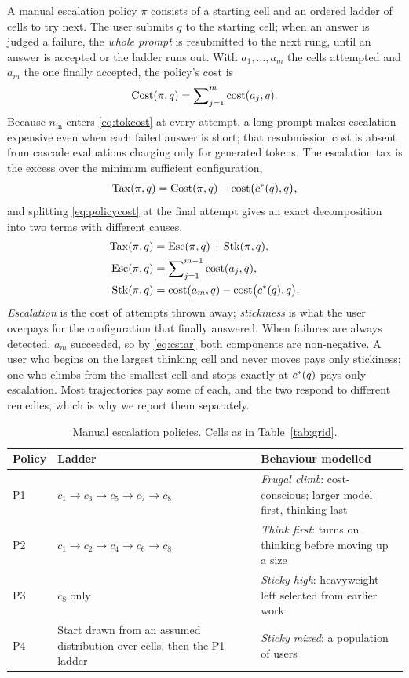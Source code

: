 A manual escalation policy $\pi$ consists of a starting cell and an ordered
ladder of cells to try next. The user submits $q$ to the starting cell; when
an answer is judged a failure, the \emph{whole prompt} is resubmitted to the
next rung, until an answer is accepted or the ladder runs out. With
$a_1, \dots, a_m$ the cells attempted and $a_m$ the one finally accepted, the
policy's cost is
\begin{equation}
  \mathrm{Cost}(\pi, q) = \sum\nolimits_{j=1}^{m} \mathrm{cost}(a_j, q).
  \label{eq:policycost}
\end{equation}
Because $n_{\mathrm{in}}$ enters \eqref{eq:tokcost} at every attempt, a long
prompt makes escalation expensive even when each failed answer is short; that
resubmission cost is absent from cascade evaluations charging only for
generated tokens. The escalation tax is the excess over the minimum
sufficient configuration,
\begin{equation}
  \mathrm{Tax}(\pi, q) = \mathrm{Cost}(\pi, q) - \mathrm{cost}\bigl(c^{*}(q), q\bigr),
  \label{eq:tax}
\end{equation}
and splitting \eqref{eq:policycost} at the final attempt gives an exact
decomposition into two terms with different causes,
\begin{align}
  \mathrm{Tax}(\pi, q) &= \mathrm{Esc}(\pi, q) + \mathrm{Stk}(\pi, q), \label{eq:decomp}\\
  \mathrm{Esc}(\pi, q) &= \sum\nolimits_{j=1}^{m-1} \mathrm{cost}(a_j, q), \nonumber\\
  \mathrm{Stk}(\pi, q) &= \mathrm{cost}(a_m, q) - \mathrm{cost}\bigl(c^{*}(q), q\bigr). \nonumber
\end{align}
\emph{Escalation} is the cost of attempts thrown away; \emph{stickiness} is
what the user overpays for the configuration that finally answered. When
failures are always detected, $a_m$ succeeded, so by \eqref{eq:cstar} both
components are non-negative. A user who begins on the largest thinking cell
and never moves pays only stickiness; one who climbs from the smallest cell
and stops exactly at $c^{*}(q)$ pays only escalation. Most trajectories pay
some of each, and the two respond to different remedies, which is why we
report them separately.

\begin{table}[ht]
\centering
\caption{Manual escalation policies. Cells as in Table~\ref{tab:grid}.}
\label{tab:policies}
\begin{tabularx}{\textwidth}{@{}l p{3.4cm} >{\raggedright\arraybackslash}X@{}}
\toprule
Policy & Ladder & Behaviour modelled \\
\midrule
P1 & $c_1{\to}c_3{\to}c_5{\to}c_7{\to}c_8$ & \emph{Frugal climb}: cost-conscious; larger model first, thinking last \\
P2 & $c_1{\to}c_2{\to}c_4{\to}c_6{\to}c_8$ & \emph{Think first}: turns on thinking before moving up a size \\
P3 & $c_8$ only & \emph{Sticky high}: heavyweight left selected from earlier work \\
P4 & Start drawn from an assumed distribution over cells, then the P1 ladder & \emph{Sticky mixed}: a population of users \\
\bottomrule
\end{tabularx}
\end{table}

